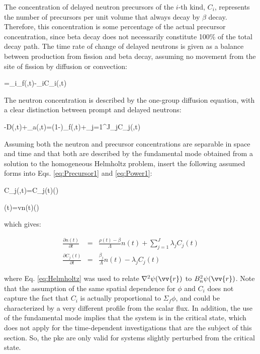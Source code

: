 The concentration of delayed neutron precursors of the \(i\)-th kind, \(C_i\), represents the number of precursors per unit volume that always decay by \(\beta\) decay. Therefore, this concentration is some percentage of the actual precursor concentration, since beta decay does not necessarily constitute 100\% of the total decay path. The time rate of change of delayed neutrons is given as a balance between production from fission and beta decay, assuming no movement from the site of fission by diffusion or convection:

\beq
\label{eq:Precursor1}
=\beta_i\nu\Sigma_f\phi(,t)-\lambda_iC_i(,t)
\eeq

The neutron concentration is described by the one-group diffusion equation, with a clear distinction between prompt and delayed neutrons:

\beq
\label{eq:Power1}
-\nabla\cdot\left\lbrack D\nabla\phi(,t)\right\rbrack+\Sigma_a\phi(,t)=(1-\beta)\nu\Sigma_f\phi(,t)+\sum_{j=1}^J\lambda_jC_j(,t)
\eeq

Assuming both the neutron and precursor concentrations are separable in space and time and that both are described by the fundamental mode obtained from a solution to the homogeneous Helmholtz problem, insert the following assumed forms into Eqs. \eqref{eq:Precursor1} and \eqref{eq:Power1}:

\beq
C_j(,t)=C_j(t)\psi()
\eeq

\beq
\phi(t)=vn(t)\psi()
\eeq

which gives:

\begin{subequations}
\label{eq:PKE}
\begin{eqnarray}
\frac{\partial n(t)}{\partial t}&=&\frac{\rho(t)-\beta}{\Lambda}n(t)+\sum_{j=1}^J\lambda_jC_j(t)\\
\frac{\partial C_j(t)}{\partial t}&=&\frac{\beta_j}{\Lambda}n(t)-\lambda_jC_j(t)
\end{eqnarray}
\end{subequations}

where Eq. \eqref{eq:Helmholtz} was used to relate \(\nabla^2\psi(\vv{r})\) to \(B_n^2\psi(\vv{r})\). Note that the assumption of the same spatial dependence for \(\phi\) and \(C_i\) does not capture the fact that \(C_i\) is actually proportional to \(\Sigma_f\phi\), and could be characterized by a very different profile from the scalar flux. In addition, the use of the fundamental mode implies that the system is in the critical state, which does not apply for the time-dependent investigations that are the subject of this section. So, the \gls{pke} are only valid for systems slightly perturbed from the critical state.

